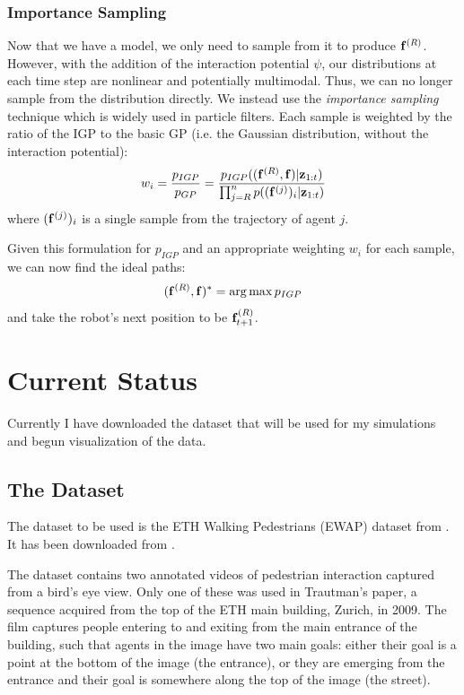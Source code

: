 \documentclass[a4paper,11pt,headings=small]{article}
\DeclareMathOperator*{\argmax}{arg\,max}
\begin{document}

\subsubsection*{Importance Sampling}
\quad Now that we have a model, we only need to sample from it to produce $\mathbf{f}^{(R)}$. However, with the addition of the interaction potential $\psi$, our distributions at each time step are nonlinear and potentially multimodal. Thus, we can no longer sample from the distribution directly. We instead use the \emph{importance sampling} technique which is widely used in particle filters. Each sample is weighted by the ratio of the IGP to the basic GP (i.e. the Gaussian distribution, without the interaction potential):
$$ w_i = \frac{p_{IGP}}{p_{GP}} = \frac{p_{IGP}((\mathbf{f}^{(R)},\mathbf{f}) | \mathbf{z}_{1:t})}{\prod_{j=R}^n p((\mathbf{f}^{(j)})_i | \mathbf{z}_{1:t})} $$
where $(\mathbf{f}^{(j)})_i$ is a single sample from the trajectory of agent $j$.

Given this formulation for $p_{IGP}$ and an appropriate weighting $w_i$ for each sample, we can now find the ideal paths:
$$ (\fr,\f)^* = \argmax p_{IGP} $$
and take the robot's next position to be $\mathbf{f}^{(R)}_{t+1}$.

\section*{Current Status}
\quad Currently I have downloaded the dataset that will be used for my simulations and begun visualization of the data.

\subsection*{The Dataset}
\quad The dataset to be used is the ETH Walking Pedestrians (EWAP) dataset from \cite{Pellegrini2009}. It has been downloaded from \cite{dataset}.

The dataset contains two annotated videos of pedestrian interaction captured from a bird's eye view. Only one of these was used in Trautman's paper, a sequence acquired from the top of the ETH main building, Zurich, in 2009. The film captures people entering to and exiting from the main entrance of the building, such that agents in the image have two main goals: either their goal is a point at the bottom of the image (the entrance), or they are emerging from the entrance and their goal is somewhere along the top of the image (the street).
\end{document}
